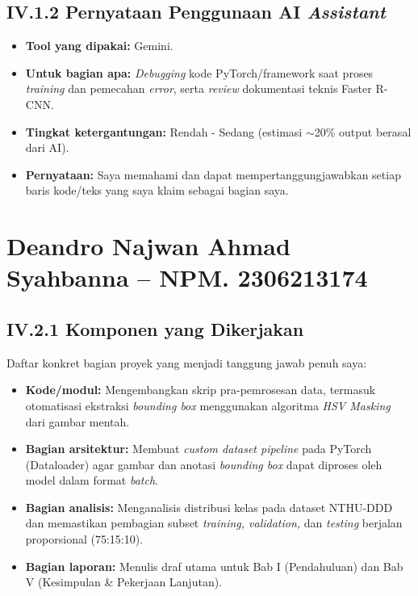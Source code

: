 \documentclass[11pt,a4paper,oneside]{report}
\begin{document}
\subsection*{IV.1.2 Pernyataan Penggunaan AI \textit{Assistant}}
\begin{itemize}[leftmargin=*]
    \item \textbf{Tool yang dipakai:} Gemini.
    \item \textbf{Untuk bagian apa:} \textit{Debugging} kode PyTorch/framework saat proses \textit{training} dan pemecahan \textit{error}, serta \textit{review} dokumentasi teknis Faster R-CNN.
    \item \textbf{Tingkat ketergantungan:} Rendah - Sedang (estimasi $\sim$20\% output berasal dari AI).
    \item \textbf{Pernyataan:} Saya memahami dan dapat mempertanggungjawabkan setiap baris kode/teks yang saya klaim sebagai bagian saya.
\end{itemize}

\section{Deandro Najwan Ahmad Syahbanna -- NPM. 2306213174}

\subsection*{IV.2.1 Komponen yang Dikerjakan}
Daftar konkret bagian proyek yang menjadi tanggung jawab penuh saya:
\begin{itemize}[leftmargin=*]
    \item \textbf{Kode/modul:} Mengembangkan skrip pra-pemrosesan data, termasuk otomatisasi ekstraksi \textit{bounding box} menggunakan algoritma \textit{HSV Masking} dari gambar mentah.
    \item \textbf{Bagian arsitektur:} Membuat \textit{custom dataset pipeline} pada PyTorch (Dataloader) agar gambar dan anotasi \textit{bounding box} dapat diproses oleh model dalam format \textit{batch}.
    \item \textbf{Bagian analisis:} Menganalisis distribusi kelas pada dataset NTHU-DDD dan memastikan pembagian subset \textit{training, validation,} dan \textit{testing} berjalan proporsional (75:15:10).
    \item \textbf{Bagian laporan:} Menulis draf utama untuk Bab I (Pendahuluan) dan Bab V (Kesimpulan \& Pekerjaan Lanjutan).
\end{itemize}
\end{document}

